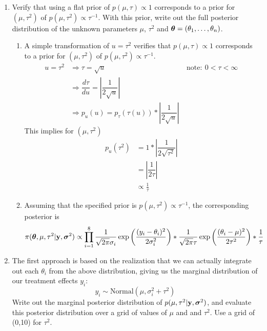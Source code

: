 \documentclass[12pt]{article}
\def\y{\mathbf{y}}
\newcommand{\si}{\mbox{\boldmath $\sigma$}}
\newcommand{\bth}{\mbox{\boldmath $\theta$}}
\begin{document}
\begin{enumerate}
	{\leftmargin=1em}
	
	\item Verify that using a flat prior of $p(\mu,\tau)\propto 1$ corresponds to a prior for $(\mu,\tau^2)$ of $p(\mu,\tau^2) \propto \tau^{-1}$. With this prior, write out the full posterior distribution of the unknown parameters $\mu$, $\tau^2$ and $\bth=(\theta_1,\ldots,\theta_n)$. 
	\begin{enumerate}
		\item A simple transformation of $u=\tau^2$ verifies that $p(\mu,\tau)\propto 1$ corresponds to a prior for $(\mu,\tau^2)$ of $p(\mu,\tau^2) \propto \tau^{-1}$. 
		\begin{align*}
			u = \tau^2 &\Rightarrow \tau=\sqrt{u} & \mathrm{note: } \ 0<\tau<\infty \\
			&\Rightarrow \dfrac{d\tau}{d u} = |\dfrac{1}{2 \sqrt{u}}| \\
			&\Rightarrow p_u (u) = p_\tau (\tau(u)) * |\dfrac{1}{2 \sqrt{u}}| \ 
		\end{align*}
		This implies for $(\mu,\tau^2)$ 
		\begin{align*}
			p_u (\tau^2) & = 1 * |\dfrac{1}{2 \sqrt{\tau^2}}| \\
			& = |\dfrac{1}{2 \tau } | \\
			& \propto \frac{1}{\tau} 
		\end{align*}
		
		\item Assuming that the specified prior is $p(\mu,\tau^2) \propto \tau^{-1}$, the corresponding posterior is
		\[
			\pi(\bth, \mu, \tau^2 | \mathbf{y}, \si^2) \propto \prod_{i=1}^8  \frac{1}{\sqrt{2\pi} \sigma_{i}} \exp \left( \frac{(y_i - \theta_i)^2}{2\sigma_{i}^2} \right) 
			* \frac{1}{\sqrt{2\pi} \tau} \exp\left(\frac{(\theta_i - \mu)^2}{2\tau^2} \right) * \frac{1}{\tau} 
		\]
	\end{enumerate}
	
	\item The first approach is based on the realization that we can actually integrate out each $\theta_i$ from the above distribution, giving us the marginal distribution of our treatment effects $y_i$: $$ y_i \sim \mbox{Normal}(\mu,\sigma^2_i+\tau^2) $$ Write out the marginal posterior distribution of $p(\mu,\tau^2|\y,\si^2)$, and evaluate this posterior distribution over a grid of values of $\mu$ and and $\tau^2$. Use a grid of (0,10) for $\tau^2$.
	

\end{enumerate}
\end{document}
